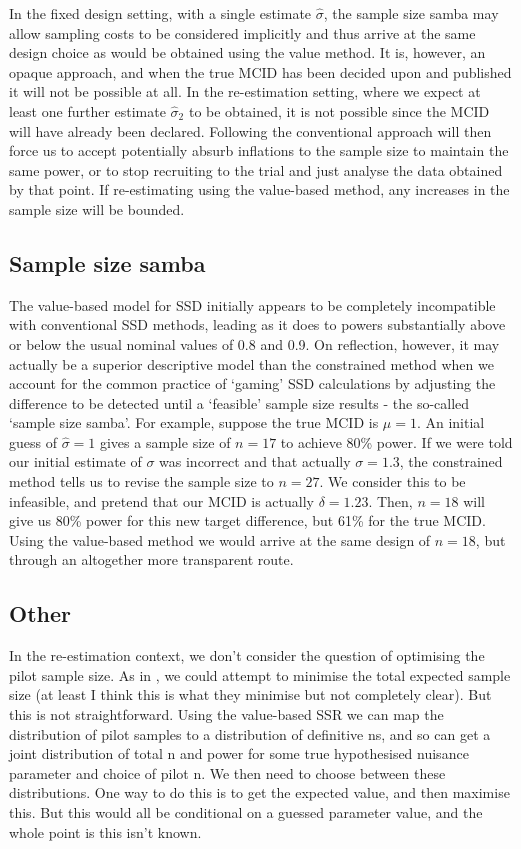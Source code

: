 \documentclass[sagev, Crown]{sagej}
\begin{document}
In the fixed design setting, with a single estimate $\hat{\sigma}$, the sample size samba may allow sampling costs to be considered implicitly and thus arrive at the same design choice as would be obtained using the value method. It is, however, an opaque approach, and when the true MCID has been decided upon and published it will not be possible at all. In the re-estimation setting, where we expect at least one further estimate $\hat{\sigma}_2$ to be obtained, it is not possible since the MCID will have already been declared. Following the conventional approach will then force us to accept potentially absurb inflations to the sample size to maintain the same power, or to stop recruiting to the trial and just analyse the data obtained by that point. If re-estimating using the value-based method, any increases in the sample size will be bounded.

\subsection{Sample size samba}

The value-based model for SSD initially appears to be completely incompatible with conventional SSD methods, leading as it does to powers substantially above or below the usual nominal values of 0.8 and 0.9. On reflection, however, it may actually be a superior descriptive model than the constrained method when we account for the common practice of `gaming' SSD calculations by adjusting the difference to be detected until a `feasible' sample size results - the so-called `sample size samba'. For example, suppose the true MCID is $\mu = 1$. An initial guess of $\hat{\sigma} = 1$ gives a sample size of $n = 17$ to achieve 80\% power. If we were told our initial estimate of $\sigma$ was incorrect and that actually $\sigma = 1.3$, the constrained method tells us to revise the sample size to $n = 27$. We consider this to be infeasible, and pretend that our MCID is actually $\delta = 1.23$. Then, $n = 18$ will give us 80\% power for this new target difference, but 61\% for the true MCID. Using the value-based method we would arrive at the same design of $n = 18$, but through an altogether more transparent route.

\subsection{Other}

In the re-estimation context, we don't consider the question of optimising the pilot sample size. As in \cite{Whitehead2015}, we could attempt to minimise the total expected sample size (at least I think this is what they minimise but not completely clear). But this is not straightforward. Using the value-based SSR we can map the distribution of pilot samples to a distribution of definitive ns, and so can get a joint distribution of total n and power for some true hypothesised nuisance parameter and choice of pilot n. We then need to choose between these distributions. One way to do this is to get the expected value, and then maximise this. But this would all be conditional on a guessed parameter value, and the whole point is this isn't known.
\end{document}
